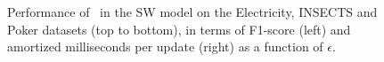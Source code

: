 \begin{figure}
\caption{Performance of \algo\ in the SW model on the Electricity, INSECTS and Poker datasets (top to bottom), in terms of F1-score (left) and amortized milliseconds per update (right) as a function of $\epsilon$.}\label{fig:SW}
\vspace*{10pt}
\end{figure}

